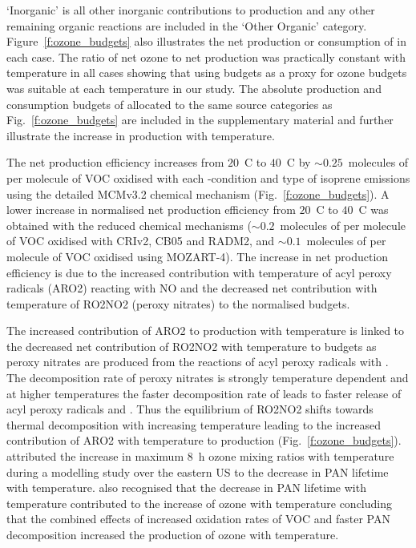 `Inorganic' is all other inorganic contributions to  production and any other remaining organic reactions are included in the `Other Organic' category.
Figure~\ref{f:ozone_budgets} also illustrates the net production or consumption of  in each case.
The ratio of net ozone to net  production was practically constant with temperature in all cases showing that using  budgets as a proxy for ozone budgets was suitable at each temperature in our study.
The absolute production and consumption budgets of  allocated to the same source categories as Fig.~\ref{f:ozone_budgets} are included in the supplementary material and further illustrate the increase in  production with temperature.

The net  production efficiency increases from $20$~\degree C to $40$~\degree C by $\sim0.25$~molecules of  per molecule of VOC oxidised with each -condition and type of isoprene emissions using the detailed MCMv3.2 chemical mechanism (Fig.~\ref{f:ozone_budgets}).
A lower increase in normalised net  production efficiency from $20$~\degree C to $40$~\degree C was obtained with the reduced chemical mechanisms ($\sim0.2$~molecules of  per molecule of VOC oxidised with CRIv2, CB05 and RADM2, and $\sim0.1$~molecules of  per molecule of VOC oxidised using MOZART-4).
The increase in net  production efficiency is due to the increased contribution with temperature of acyl peroxy radicals (ARO2) reacting with NO and the decreased net contribution with temperature of RO2NO2 (peroxy nitrates) to the normalised  budgets.

The increased contribution of ARO2 to  production with temperature is linked to the decreased net contribution of RO2NO2 with temperature to  budgets as peroxy nitrates are produced from the reactions of acyl peroxy radicals with .
The decomposition rate of peroxy nitrates is strongly temperature dependent and at higher temperatures the faster decomposition rate of  leads to faster release of acyl peroxy radicals and .
Thus the equilibrium of RO2NO2 shifts towards thermal decomposition with increasing temperature leading to the increased contribution of ARO2 with temperature to  production (Fig.~\ref{f:ozone_budgets}).
\citet{Dawson:2007} attributed the increase in maximum 8~h ozone mixing ratios with temperature during a modelling study over the eastern US to the decrease in PAN lifetime with temperature.
\citet{Steiner:2006} also recognised that the decrease in PAN lifetime with temperature contributed to the increase of ozone with temperature concluding that the combined effects of increased oxidation rates of VOC and faster PAN decomposition increased the production of ozone with temperature.

